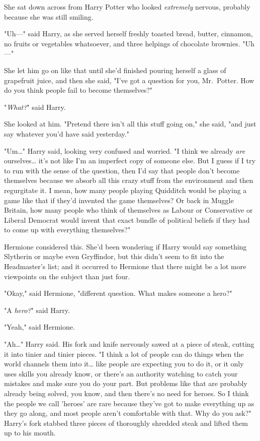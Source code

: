 She sat down across from Harry Potter who looked \emph{extremely} nervous, 
probably because she was still smiling.

"Uh---" said Harry, as she served herself freshly toasted bread, butter, 
cinnamon, no fruits or vegetables whatsoever, and three helpings of chocolate 
brownies. "Uh---"

She let him go on like that until she'd finished pouring herself a glass of 
grapefruit juice, and then she said, "I've got a question for you, Mr.~Potter. 
How do you think people fail to become themselves?"

"\emph{What?}" said Harry.

She looked at him. "Pretend there isn't all this stuff going on," she said, 
"and just say whatever you'd have said yesterday."

"Um{\ldots}" Harry said, looking very confused and worried. "I think we already 
\emph{are} ourselves{\ldots} it's not like I'm an imperfect copy of someone 
else. But I guess if I try to run with the sense of the question, then I'd say 
that people don't become themselves because we absorb all this crazy stuff from 
the environment and then regurgitate it. I mean, how many people playing 
Quidditch would be playing a game like that if they'd invented the game 
themselves? Or back in Muggle Britain, how many people who think of themselves 
as Labour or Conservative or Liberal Democrat would invent that exact bundle of 
political beliefs if they had to come up with everything themselves?"

Hermione considered this. She'd been wondering if Harry would say something 
Slytherin or maybe even Gryffindor, but this didn't seem to fit into the 
Headmaster's list; and it occurred to Hermione that there might be a lot more 
viewpoints on the subject than just four.

"Okay," said Hermione, "different question. What makes someone a hero?"

"A \emph{hero?}" said Harry.

"Yeah," said Hermione.

"Ah{\ldots}" Harry said. His fork and knife nervously sawed at a piece of 
steak, cutting it into tinier and tinier pieces. "I think a lot of people can 
do things when the world channels them into it{\ldots} like people are 
expecting you to do it, or it only uses skills you already know, or there's an 
authority watching to catch your mistakes and make sure you do your part. But 
problems like that are probably already being solved, you know, and then 
there's no need for heroes. So I think the people we call 'heroes' are rare 
because they've got to make everything up as they go along, and most people 
aren't comfortable with that. Why do you ask?" Harry's fork stabbed three 
pieces of thoroughly shredded steak and lifted them up to his mouth.


